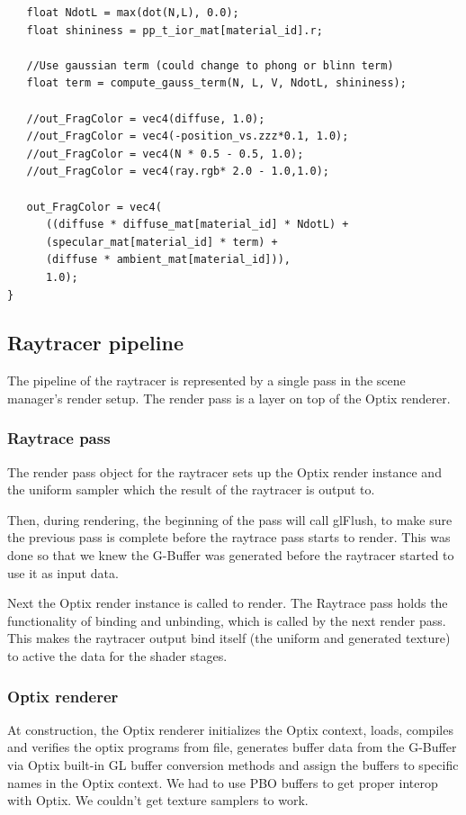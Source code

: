 \begin{lstlisting}
   float NdotL = max(dot(N,L), 0.0);
   float shininess = pp_t_ior_mat[material_id].r;
	
   //Use gaussian term (could change to phong or blinn term)
   float term = compute_gauss_term(N, L, V, NdotL, shininess);
    
   //out_FragColor = vec4(diffuse, 1.0);
   //out_FragColor = vec4(-position_vs.zzz*0.1, 1.0);
   //out_FragColor = vec4(N * 0.5 - 0.5, 1.0);
   //out_FragColor = vec4(ray.rgb* 2.0 - 1.0,1.0);
    
   out_FragColor = vec4( 
      ((diffuse * diffuse_mat[material_id] * NdotL) + 
      (specular_mat[material_id] * term) + 
      (diffuse * ambient_mat[material_id])), 
      1.0);
}
\end{lstlisting}

\subsection{Raytracer pipeline}
The pipeline of the raytracer is represented by a single pass in the scene manager's render setup. The render pass is a layer on top of the Optix renderer.

\subsubsection{Raytrace pass}
The render pass object for the raytracer sets up the Optix render instance and the uniform sampler which the result of the raytracer is output to.

Then, during rendering, the beginning of the pass will call glFlush, to make sure the previous pass is complete before the raytrace pass starts to render. This was done so that we knew the G-Buffer was generated before the raytracer started to use it as input data.

Next the Optix render instance is called to render.
The Raytrace pass holds the functionality of binding and unbinding, which is called by the next render pass. This makes the raytracer output bind itself (the uniform and generated texture) to active the data for the shader stages.

\subsubsection{Optix renderer}
At construction, the Optix renderer initializes the Optix context, loads, compiles and verifies the optix programs from file, generates buffer data from the G-Buffer via Optix built-in GL buffer conversion methods and assign the buffers to specific names in the Optix context. We had to use PBO buffers to get proper interop with Optix. We couldn't get texture samplers to work.

